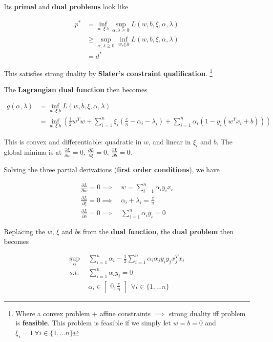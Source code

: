 \documentclass{article}
\DeclareMathOperator*{\minf}{inf}
\DeclareMathOperator*{\msup}{sup}
\begin{document}
Its \textbf{primal} and \textbf{dual problems} look like

\begin{align*}
p^* &= \minf_{w, \xi. b} \msup_{\alpha, \lambda \geq 0} L(w, b, \xi, \alpha, \lambda) \\
    &\geq \msup_{\alpha, \lambda \geq 0} \minf_{w, \xi. b} L(w, b, \xi, \alpha, \lambda) \\
    &= d^*
\end{align*}

This satisfies strong duality by \textbf{Slater's constraint qualification}.
\footnote{Where a convex problem + affine constraints $\implies$ strong duality iff problem is \textbf{feasible}.
This problem is feasible if we simply let $w = b = 0$ and $\xi_i = 1 ~ \forall i \in \{1, \dots n\}$}

The \textbf{Lagrangian dual function} then becomes

\begin{align*}
g(\alpha, \lambda) &= \minf_{w, \xi. b} L(w, b, \xi, \alpha, \lambda) \\
                   &= \minf_{w, \xi. b} (\frac{1}{2} w^{T} w + \sum_{i = 1}^{n}{\xi_i (\frac{c}{n} - \alpha_i - \lambda_i)} + \sum_{i = 1}^{n}{\alpha_i (1 - y_i (w^{T} x_i + b))})
\end{align*}

This is convex and differentiable: quadratic in $w$, and linear in $\xi_i$ and $b$.
The global minima is at $\frac{\partial L}{\partial w} = 0$, $\frac{\partial L}{\partial \xi} = 0$, $\frac{\partial L}{\partial b} = 0$.

Solving the three partial derivations (\textbf{first order conditions}), we have

\begin{align*}
\frac{\partial L}{\partial w} = 0   \implies & ~w = \sum_{i = 1}^{n}{\alpha_i y_i x_i} \\
\frac{\partial L}{\partial \xi} = 0 \implies & ~\alpha_i + \lambda_i = \frac{c}{n} \\
\frac{\partial L}{\partial b} = 0   \implies & ~\sum_{i = 1}^{n}{\alpha_i y_i = 0}
\end{align*}

Replacing the $w$, $\xi$ and $b$s from the \textbf{dual function}, the \textbf{dual problem} then becomes

\begin{align*}
\msup_{\alpha} ~ ~ & \sum_{i = 1}^{n}{\alpha_i} - \frac{1}{2} \sum_{i = 1}^{n}{\alpha_i \alpha_j y_i y_j x_j^{T} x_i} \\
s.t.               & \sum_{i = 1}^{n}{\alpha_i y_i} = 0 \\
                   & \alpha_i \in \begin{bmatrix}0, \frac{c}{n}\end{bmatrix} ~ ~ \forall i \in \{1, \dots n\}
\end{align*}
\end{document}
